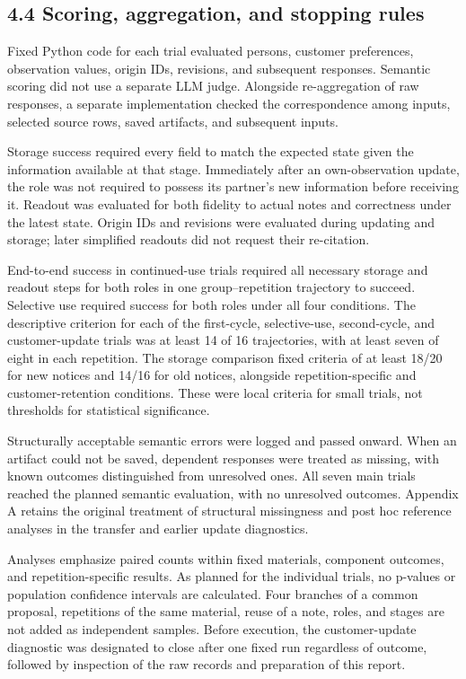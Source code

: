 \documentclass[10pt,a4paper]{article}
\begin{document}
\subsection{4.4 Scoring, aggregation, and stopping rules}\label{paper-02-scoring-aggregation-and-stopping-rules}

Fixed Python code for each trial evaluated persons, customer preferences, observation values, origin IDs, revisions, and subsequent responses. Semantic scoring did not use a separate LLM judge. Alongside re-aggregation of raw responses, a separate implementation checked the correspondence among inputs, selected source rows, saved artifacts, and subsequent inputs.

Storage success required every field to match the expected state given the information available at that stage. Immediately after an own-observation update, the role was not required to possess its partner's new information before receiving it. Readout was evaluated for both fidelity to actual notes and correctness under the latest state. Origin IDs and revisions were evaluated during updating and storage; later simplified readouts did not request their re-citation.

End-to-end success in continued-use trials required all necessary storage and readout steps for both roles in one group--repetition trajectory to succeed. Selective use required success for both roles under all four conditions. The descriptive criterion for each of the first-cycle, selective-use, second-cycle, and customer-update trials was at least 14 of 16 trajectories, with at least seven of eight in each repetition. The storage comparison fixed criteria of at least 18/20 for new notices and 14/16 for old notices, alongside repetition-specific and customer-retention conditions. These were local criteria for small trials, not thresholds for statistical significance.

Structurally acceptable semantic errors were logged and passed onward. When an artifact could not be saved, dependent responses were treated as missing, with known outcomes distinguished from unresolved ones. All seven main trials reached the planned semantic evaluation, with no unresolved outcomes. Appendix A retains the original treatment of structural missingness and post hoc reference analyses in the transfer and earlier update diagnostics.

Analyses emphasize paired counts within fixed materials, component outcomes, and repetition-specific results. As planned for the individual trials, no p-values or population confidence intervals are calculated. Four branches of a common proposal, repetitions of the same material, reuse of a note, roles, and stages are not added as independent samples. Before execution, the customer-update diagnostic was designated to close after one fixed run regardless of outcome, followed by inspection of the raw records and preparation of this report.
\end{document}
